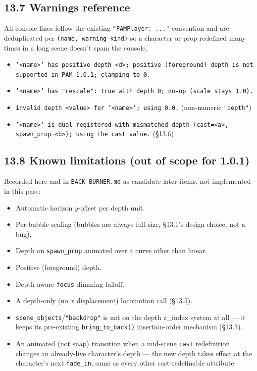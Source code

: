 \documentclass[
  11pt,
]{book}
\begin{document}
\subsection{\texorpdfstring{13.7 Warnings reference}{13.7 Warnings reference}}\label{depth-warnings-reference}

All console lines follow the existing \texttt{"PAMPlayer: ..."}
convention and are deduplicated per \texttt{(name, warning-kind)} so a
character or prop redefined many times in a long scene doesn't spam
the console.

\begin{itemize}
\item
  \texttt{'<name>' has positive depth <d>; positive (foreground) depth
  is not supported in PAM 1.0.1; clamping to 0.}
\item
  \texttt{'<name>' has "rescale": true with depth 0; no-op (scale
  stays 1.0).}
\item
  \texttt{invalid depth <value> for '<name>'; using 0.0.} (non-numeric
  \texttt{"depth"})
\item
  \texttt{'<name>' is dual-registered with mismatched depth
  (cast=<a>, spawn\_prop=<b>); using the cast value.} (\S13.6)
\end{itemize}

\subsection{\texorpdfstring{13.8 Known limitations (out of scope for 1.0.1)}{13.8 Known limitations}}\label{depth-out-of-scope}

Recorded here and in \texttt{BACK\_BURNER.md} as candidate later
items, not implemented in this pass:

\begin{itemize}
\item
  Automatic horizon $y$-offset per depth unit.
\item
  Per-bubble scaling (bubbles are always full-size, \S13.1's design
  choice, not a bug).
\item
  Depth on \texttt{spawn\_prop} animated over a curve other than
  linear.
\item
  Positive (foreground) depth.
\item
  Depth-aware \texttt{focus} dimming falloff.
\item
  A depth-only (no $x$ displacement) locomotion call (\S13.5).
\item
  \texttt{scene\_objects}/\texttt{"backdrop"} is not on the depth
  z\_index system at all --- it keeps its pre-existing
  \texttt{bring\_to\_back()} insertion-order mechanism (\S13.3).
\item
  An animated (not snap) transition when a mid-scene \texttt{cast}
  redefinition changes an already-live character's depth --- the new
  depth takes effect at the character's next \texttt{fade\_in}, same
  as every other cast-redefinable attribute.
\end{itemize}
\end{document}
